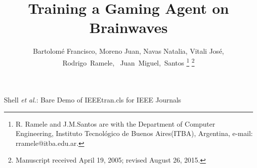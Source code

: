 \documentclass[journal]{IEEEtran}
\begin{document}
%
\title{Training a Gaming Agent on Brainwaves}
%
%
%

\author{Bartolomé Francisco, Moreno Juan,  Navas Natalia, Vitali José, \\
Rodrigo~Ramele,~ 
        Juan~Miguel,~Santos%
\thanks{R. Ramele and J.M.Santos are with the Department
of Computer Engineering, Instituto Tecnológico de Buenos Aires(ITBA), Argentina,
e-mail: rramele@itba.edu.ar.}%
\thanks{Manuscript received April 19, 2005; revised August 26, 2015.}}

% 
%



%
{Shell \MakeLowercase{\textit{et al.}}: Bare Demo of IEEEtran.cls for IEEE Journals}
% 
\end{document}
